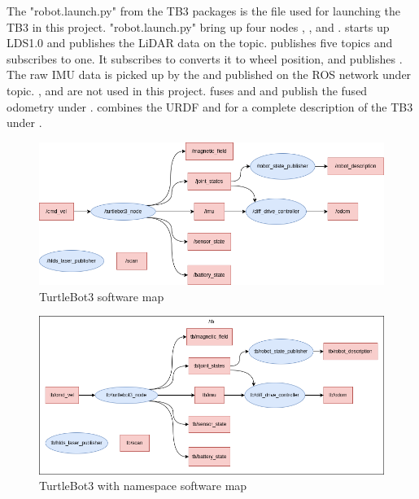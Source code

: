 The "robot.launch.py" from the TB3 packages is the file used for launching the TB3 in this project. "robot.launch.py" bring up four nodes , ,  and . 
 starts up LDS1.0 and publishes the LiDAR data on the  topic.  publishes five topics and subscribes to one. It subscribes to  converts it to wheel position, and publishes . The raw IMU data is picked up by the  and published on the ROS network under  topic. ,  and  are not used in this project. 
 fuses  and  and publish the fused odometry under . 
 combines the URDF and  for a complete description of the TB3 under .

\begin{figure}[H]
    \centering
    \includegraphics[width = 1\textwidth]{Figures/drawio/TB3_rqt.drawio.png}
    \caption{TurtleBot3 software map}
    \label{fig:TB3SW}
\end{figure}
\begin{figure}[H]
    \centering
    \includegraphics[width = 1\textwidth]{Figures/drawio/TB3_ns_rqt.drawio.png}
    \caption{TurtleBot3 with namespace software map}
    \label{fig:TB3nsSW}
\end{figure}

